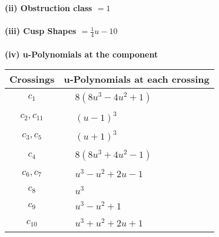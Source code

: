 \documentclass[1p]{elsarticle_modified}
\theoremstyle{definition}
\begin{document}
\flushleft \textbf{(ii) Obstruction class $= 1$}\\~\\
\flushleft \textbf{(iii) Cusp Shapes $= \frac{1}{4} u-10$}\\~\\
\newpage\renewcommand{\arraystretch}{1}
\flushleft \textbf{(iv) u-Polynomials at the component}\newline \\
\begin{tabular}{m{50pt}|m{274pt}}
Crossings & \hspace{64pt}u-Polynomials at each crossing \\
\hline $$\begin{aligned}c_{1}\end{aligned}$$&$\begin{aligned}
&8(8 u^3-4 u^2+1)
\end{aligned}$\\
\hline $$\begin{aligned}c_{2},c_{11}\end{aligned}$$&$\begin{aligned}
&(u-1)^3
\end{aligned}$\\
\hline $$\begin{aligned}c_{3},c_{5}\end{aligned}$$&$\begin{aligned}
&(u+1)^3
\end{aligned}$\\
\hline $$\begin{aligned}c_{4}\end{aligned}$$&$\begin{aligned}
&8(8 u^3+4 u^2-1)
\end{aligned}$\\
\hline $$\begin{aligned}c_{6},c_{7}\end{aligned}$$&$\begin{aligned}
&u^3- u^2+2 u-1
\end{aligned}$\\
\hline $$\begin{aligned}c_{8}\end{aligned}$$&$\begin{aligned}
&u^3
\end{aligned}$\\
\hline $$\begin{aligned}c_{9}\end{aligned}$$&$\begin{aligned}
&u^3- u^2+1
\end{aligned}$\\
\hline $$\begin{aligned}c_{10}\end{aligned}$$&$\begin{aligned}
&u^3+u^2+2 u+1
\end{aligned}$\\
\hline
\end{tabular}\\~\\
\end{document}
